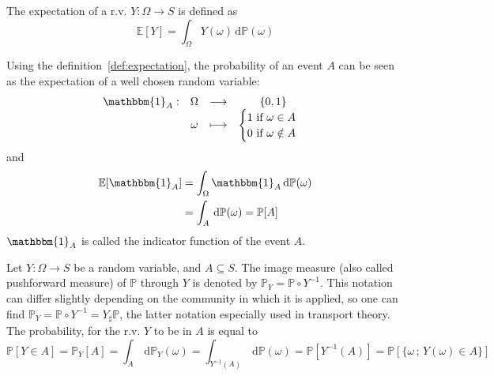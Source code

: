 \documentclass[a4paper,11pt]{article}
\newcommand{\Ex}{\mathbb{E}}
\newcommand{\Prob}{\mathbb{P}}
\theoremstyle{defi}
\numberwithin{thmCounter}{section}
\begin{document}
\begin{definition}[Expectation of a r.v.]
  \label{def:expectation}
  The expectation of a r.v. $Y:\Omega \rightarrow S$ is defined as
  \begin{equation*}
    \Ex[Y] = \int_{\Omega} Y(\omega) \,\mathrm{d}\Prob(\omega)
  \end{equation*}
\end{definition}
\begin{remark}
  Using the definition~\ref{def:expectation}, the probability of an event $A$ can be seen as the expectation of a well chosen random variable:
  \begin{equation*}
    \begin{array}{cccc}
      \mathbbm{1}_{A}:& \Omega& \longrightarrow& \{0,1\} \\
                      & \omega& \longmapsto & \begin{cases}
                        1\text{ if } \omega \in A \\
                        0 \text{ if } \omega \notin A
                                              \end{cases}
    \end{array}
  \end{equation*}
  and
  \begin{align*}
    \Ex[\mathbbm{1}_A] &= \int_{\Omega} \mathbbm{1}_A \, \mathrm{d}\Prob(\omega) \\
                       &= \int_{A} \, \mathrm{d}\Prob(\omega) = \Prob[A]
  \end{align*}
  $\mathbbm{1}_A$ is called the indicator function of the event $A$.
\end{remark}
\begin{definition}
  \label{def:image_measure}
  Let $Y:\Omega \rightarrow S$ be a random variable, and $A \subseteq S$. The image measure (also called pushforward measure) of $\Prob$ through $Y$ is denoted by $\Prob_Y = \Prob \circ Y^{-1}$. This notation can differ slightly depending on the community in which it is applied, so one can find $ \Prob_Y = \Prob \circ Y^{-1} = Y_{\sharp}\Prob$, the latter notation especially used in transport theory. The probability, for the r.v. $Y$ to be in $A$ is equal to
  \begin{equation*}
    \Prob[Y \in A] = \Prob_Y[A] = \int_{A}\,\mathrm{d}\Prob_Y(\omega) =  \int_{Y^{-1}(A)}\,\mathrm{d}\Prob(\omega) = \Prob[Y^{-1}(A)] = \Prob[\{\omega\,;\,Y(\omega) \in A\}]
  \end{equation*}
\end{definition}
\end{document}
